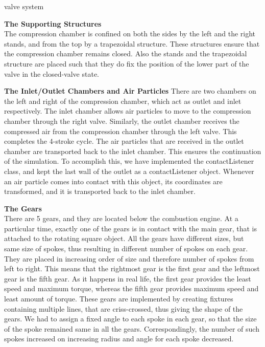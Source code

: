 \documentclass[40pt]{article}
\begin{document}
{\begin{description}
\begin{center}
\small{valve system\\}
\end{center}
      \item[$\bullet$ ] \textbf{The Supporting Structures\\}
      The compression chamber is confined on both the sides by the left and the right stands, and from the top by a trapezoidal structure. These structures ensure that the compression chamber remains closed. Also the stands and the trapezoidal structure are placed such that they do fix the position of the
lower part of the valve in the closed-valve state.

        \item[$\bullet$ ] \textbf{The Inlet/Outlet Chambers and Air Particles}
        There are two chambers on the left and right of the compression chamber, which act as outlet and inlet respectively. The inlet chamber allows air particles to move to the compression chamber through the right valve. Similarly, the outlet chamber receives the compressed air from the compression chamber through the left valve. This completes the 4-stroke cycle. The air particles that are received in the outlet chamber are transported back to the inlet chamber. This ensures the continuation of the simulation. To accomplish this, we have implemented the contactListener class, and kept the last wall of the outlet as a contactListener object. Whenever an air particle comes into contact with this object, its coordinates are transformed, and it is transported back to the inlet chamber.
	\item[$\bullet$ ] \textbf{The Gears\\}
	There are 5 gears, and they are located below the combustion engine. At a particular time, exactly one of the gears is in contact with the main gear, that is attached to the rotating square object. All the gears have different sizes, but same size of spokes, thus resulting in different number of spokes on each gear. They are placed in increasing order of size and therefore number of spokes from left to right. This means that the rightmost gear is the first gear and the leftmost gear is the fifth gear. As it happens in real life, the first gear provides the least speed and maximum torque, whereas the fifth gear provides maximum speed and least amount of torque.
These gears are implemented by creating fixtures containing multiple lines, that are criss-crossed, thus giving the shape of the gears. We had to assign a fixed angle to each spoke in each gear, so that the size of the spoke remained same in all the gears. Correspondingly, the number of such spokes increased on increasing radius and angle for each spoke decreased.


\end{description}}
\end{document}
